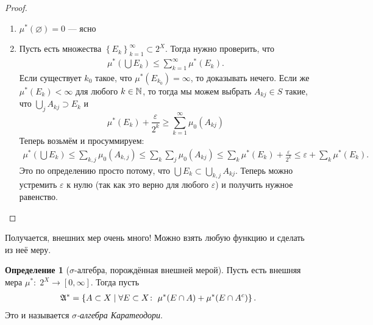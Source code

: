 \documentclass[a4paper,14pt]{extarticle}
\newcounter{theoremCnt}
\theoremstyle{definition}
\newtheorem{df}[theoremCnt]{Определение}
\theoremstyle{plain}
\theoremstyle{plain}
\theoremstyle{plain}
\theoremstyle{plain}
\theoremstyle{definition}
\theoremstyle{definition}
\theoremstyle{definition}
\theoremstyle{definition}
\theoremstyle{definition}
\theoremstyle{definition}
\theoremstyle{plain}
\theoremstyle{plain}
\theoremstyle{plain}
\theoremstyle{plain}
\theoremstyle{definition}
\theoremstyle{definition}
\theoremstyle{definition}
\theoremstyle{definition}
\theoremstyle{definition}
\newcommand{\N}{\ensuremath \mathbb{N}}
\newcommand{\A}{\ensuremath \mathfrak{A}}
\begin{document}
\begin{proof}\
 \begin{enumerate}
  \item $ \mu^\ast(\varnothing) = 0 $ --- ясно
  \item Пусть есть множества $ \left\{ E_k \right\}_{k=1}^\infty \subset 2^X$. Тогда нужно проверить, что
   \begin{align*}
    \mu^\ast\left( \bigcup E_k \right) \leqslant \sum_{k=1}^{\infty} \mu^\ast(E_k)
   .\end{align*} Если существует $ k_0 $ такое, что $ \mu^\ast(E_{k_0}) = \infty $, то доказывать нечего. Если же $ \mu^\ast(E_k) < \infty $ для любого $ k \in \N $, то тогда мы можем выбрать $ A_{kj} \in S $ такие, что $ \bigcup_j A_{kj} \supset E_k $ и $$ \mu^\ast(E_k) + \frac{\varepsilon}{2^k} \geqslant \sum_{k=1}^{\infty} \mu_0(A_{kj}) $$ Теперь возьмём и просуммируем:
   \begin{align*}
    \mu^\ast\left( \bigcup E_k \right) \leqslant \sum_{k,j} \mu_0(A_{k,j}) \leqslant \sum_k \sum_j \mu_0(A_{kj}) \leqslant \sum_{k} \mu^\ast(E_k) + \frac{\varepsilon}{2^k} \leqslant \varepsilon + \sum_k \mu^\ast(E_k)
   .\end{align*} Это по определению просто потому, что $ \bigcup E_k \subset \bigcup_{k,j} A_{kj} $. Теперь можно устремить $ \varepsilon $ к нулю (так как это верно для любого $ \varepsilon $) и получить нужное равенство.
 \end{enumerate}
\end{proof}
Получается, внешних мер очень много! Можно взять любую функцию и сделать из неё меру.

\begin{df}[$ \sigma $-алгебра, порождённая внешней мерой]
 Пусть есть внешняя мера $ \mu^\ast \colon\; 2^X \to [0,\infty] $. Тогда пусть \begin{align*}
  \A^\ast = \left\{ A \subset X \mid \forall E \subset X \colon\; \mu^\ast (E \cap A) + \mu^\ast(E \cap A^c) \right\}
 .\end{align*}
 Это и называется \textit{$ \sigma $-алгебра Каратеодори}.
\end{df}
\end{document}
